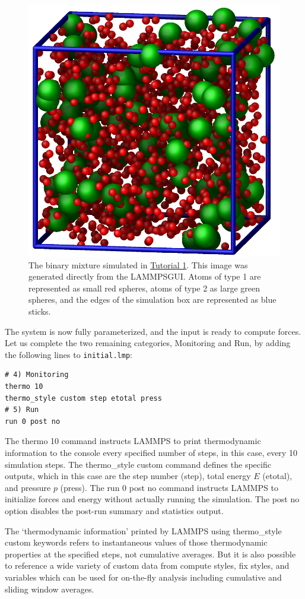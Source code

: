 \documentclass[9pt,tutorial]{livecoms}
\newcommand{\lmpcmd}[1]{\hspace{0pt}\colorbox{listing}{\textcolor{command}{\small{#1}}}\hspace{0pt}} %
\newcommand{\flecmd}[1]{\textcolor{command}{\texttt{#1}}} %
\newcommand{\lammpsgui}{\textsf{LAMMPS\textendash GUI}}
\begin{document}
\begin{figure}
\centering
\includegraphics[width=0.55\linewidth]{LJ}
\caption{The binary mixture simulated in \hyperref[lennard-jones-label]{Tutorial 1}.
  This image was generated directly from the \lammpsgui{}.  Atoms of
  type 1 are represented as small red spheres, atoms of type 2 as large
  green spheres, and the edges of the simulation box are represented as blue sticks.}
\label{fig:LJ}
\end{figure}

The system is now fully parameterized, and the input is ready to compute
forces.  Let us complete the two remaining categories,
\lmpcmd{Monitoring} and \lmpcmd{Run}, by adding the following lines
to \flecmd{initial.lmp}:
\begin{lstlisting}
# 4) Monitoring
thermo 10
thermo_style custom step etotal press
# 5) Run
run 0 post no
\end{lstlisting}
The \lmpcmd{thermo 10} command instructs LAMMPS to print thermodynamic
information to the console every specified number of steps, in this case,
every 10 simulation steps.  The \lmpcmd{thermo\_style custom} command
defines the specific outputs, which in this case are the step number
(\lmpcmd{step}), total energy $E$ (\lmpcmd{etotal}), and pressure $p$ (\lmpcmd{press}).
The \lmpcmd{run 0 post no} command instructs LAMMPS to initialize forces and energy
without actually running the simulation.  The \lmpcmd{post no} option disables
the post-run summary and statistics output.

\begin{note} {\color{blue}The `thermodynamic information' printed by
    LAMMPS using \lmpcmd{thermo\_style custom} keywords refers to
    instantaneous values of those thermodynamic properties at the
    specified steps, not cumulative averages.  But it is also possible
    to reference a wide variety of custom data from compute styles, fix
    styles, and variables which can be used for on-the-fly analysis
    including cumulative and sliding window averages.}
\end{note}
\end{document}
